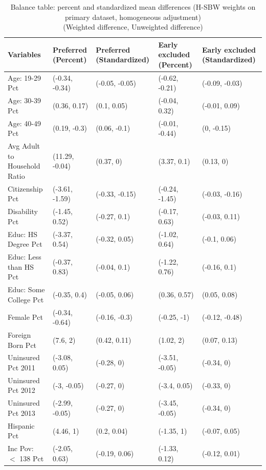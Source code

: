 \newpage

\begin{landscape}
\begin{table}[h!]\caption{Balance table: percent and standardized mean differences (H-SBW weights on primary dataset, homogeneous adjustment) \\ (Weighted difference, Unweighted difference)}\label{tab:baltab1}
\centering
\begin{threeparttable}\begin{tabular}{lllll}
  \hline
Variables & Preferred (Percent) & Preferred (Standardized) & Early excluded (Percent) & Early excluded (Standardized) \\ 
  \hline
Age: 19-29 Pct & (-0.34, -0.34) & (-0.05, -0.05) & (-0.62, -0.21) & (-0.09, -0.03) \\ 
  Age: 30-39 Pct & (0.36, 0.17) & (0.1, 0.05) & (-0.04, 0.32) & (-0.01, 0.09) \\ 
  Age: 40-49 Pct & (0.19, -0.3) & (0.06, -0.1) & (-0.01, -0.44) & (0, -0.15) \\ 
  Avg Adult to Household Ratio & (11.29, -0.04) & (0.37, 0) & (3.37, 0.1) & (0.13, 0) \\ 
  Citizenship Pct & (-3.61, -1.59) & (-0.33, -0.15) & (-0.24, -1.45) & (-0.03, -0.16) \\ 
  Disability Pct & (-1.45, 0.52) & (-0.27, 0.1) & (-0.17, 0.63) & (-0.03, 0.11) \\ 
  Educ: HS Degree Pct & (-3.37, 0.54) & (-0.32, 0.05) & (-1.02, 0.64) & (-0.1, 0.06) \\ 
  Educ: Less than HS Pct & (-0.37, 0.83) & (-0.04, 0.1) & (-1.22, 0.76) & (-0.16, 0.1) \\ 
  Educ: Some College Pct & (-0.35, 0.4) & (-0.05, 0.06) & (0.36, 0.57) & (0.05, 0.08) \\ 
  Female Pct & (-0.34, -0.64) & (-0.16, -0.3) & (-0.25, -1) & (-0.12, -0.48) \\ 
  Foreign Born Pct & (7.6, 2) & (0.42, 0.11) & (1.02, 2) & (0.07, 0.13) \\ 
  Uninsured Pct 2011 & (-3.08, 0.05) & (-0.28, 0) & (-3.51, -0.05) & (-0.34, 0) \\ 
  Uninsured Pct 2012 & (-3, -0.05) & (-0.27, 0) & (-3.4, 0.05) & (-0.33, 0) \\ 
  Uninsured Pct 2013 & (-2.99, -0.05) & (-0.27, 0) & (-3.45, -0.05) & (-0.34, 0) \\ 
  Hispanic Pct & (4.46, 1) & (0.2, 0.04) & (-1.35, 1) & (-0.07, 0.05) \\ 
  Inc Pov: $<$ 138 Pct & (-2.05, 0.63) & (-0.19, 0.06) & (-1.33, 0.12) & (-0.12, 0.01) \\ 

\end{tabular}
\end{threeparttable}
\end{table}
\end{landscape}
